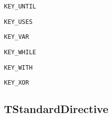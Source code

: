 \documentclass{report}
\newif\ifpdf
\begin{document}
\begin{list}{}
\begin{description}
\item[\texttt{KEY{\_}UNTIL}] \label{PasDoc_Tokenizer-KEY_UNTIL}
\index{}
 
\item[\texttt{KEY{\_}USES}] \label{PasDoc_Tokenizer-KEY_USES}
\index{}
 
\item[\texttt{KEY{\_}VAR}] \label{PasDoc_Tokenizer-KEY_VAR}
\index{}
 
\item[\texttt{KEY{\_}WHILE}] \label{PasDoc_Tokenizer-KEY_WHILE}
\index{}
 
\item[\texttt{KEY{\_}WITH}] \label{PasDoc_Tokenizer-KEY_WITH}
\index{}
 
\item[\texttt{KEY{\_}XOR}] \label{PasDoc_Tokenizer-KEY_XOR}
\index{}
 
\end{description}


\end{list}
\ifpdf
\subsection*{\large{\textbf{TStandardDirective}}\normalsize\hspace{1ex}\hrulefill}
\else
\end{document}
